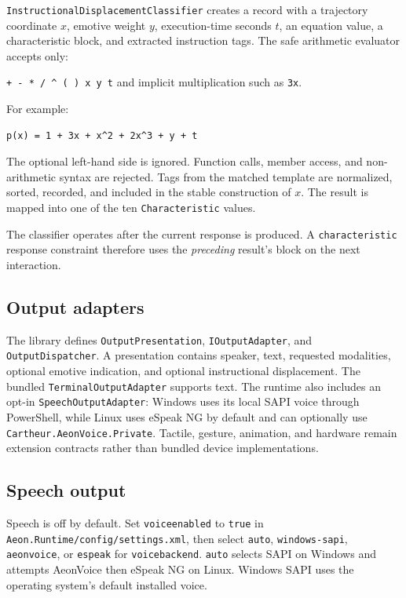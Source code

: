 \documentclass[11pt,a4paper]{article}
\begin{document}
\texttt{InstructionalDisplacementClassifier} creates a record with a trajectory coordinate $x$, emotive weight $y$, execution-time seconds $t$, an equation value, a characteristic block, and extracted instruction tags. The safe arithmetic evaluator accepts only:

\begin{center}
\texttt{+ - * / \^{} ( ) x y t} and implicit multiplication such as \texttt{3x}.
\end{center}

For example:

\begin{minipage}{\linewidth}
\begin{lstlisting}
p(x) = 1 + 3x + x^2 + 2x^3 + y + t
\end{lstlisting}
\end{minipage}

The optional left-hand side is ignored. Function calls, member access, and non-arithmetic syntax are rejected. Tags from the matched template are normalized, sorted, recorded, and included in the stable construction of $x$. The result is mapped into one of the ten \texttt{Characteristic} values.

The classifier operates after the current response is produced. A \texttt{characteristic} response constraint therefore uses the \emph{preceding} result's block on the next interaction.

\subsection{Output adapters}

The library defines \texttt{OutputPresentation}, \texttt{IOutputAdapter}, and \texttt{OutputDispatcher}. A presentation contains speaker, text, requested modalities, optional emotive indication, and optional instructional displacement. The bundled \texttt{TerminalOutputAdapter} supports text. The runtime also includes an opt-in \texttt{SpeechOutputAdapter}: Windows uses its local SAPI voice through PowerShell, while Linux uses eSpeak NG by default and can optionally use \texttt{Cartheur.AeonVoice.Private}. Tactile, gesture, animation, and hardware remain extension contracts rather than bundled device implementations.

\subsection{Speech output}

Speech is off by default. Set \texttt{voiceenabled} to \texttt{true} in \texttt{Aeon.Runtime/config/settings.xml}, then select \texttt{auto}, \texttt{windows-sapi}, \texttt{aeonvoice}, or \texttt{espeak} for \texttt{voicebackend}. \texttt{auto} selects SAPI on Windows and attempts AeonVoice then eSpeak NG on Linux. Windows SAPI uses the operating system's default installed voice.
\end{document}
